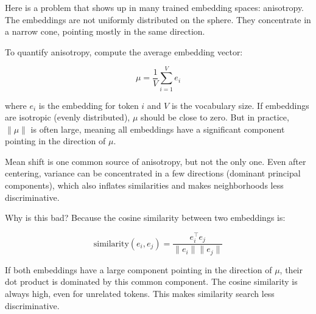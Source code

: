 Here is a problem that shows up in many trained embedding spaces: anisotropy. The embeddings are not uniformly distributed on the sphere. They concentrate in a narrow cone, pointing mostly in the same direction.

To quantify anisotropy, compute the average embedding vector:

\begin{equation}
\mu = \frac{1}{V} \sum_{i=1}^V e_i
\end{equation}

where $e_i$ is the embedding for token $i$ and $V$ is the vocabulary size. If embeddings are isotropic (evenly distributed), $\mu$ should be close to zero. But in practice, $\|\mu\|$ is often large, meaning all embeddings have a significant component pointing in the direction of $\mu$.

Mean shift is one common source of anisotropy, but not the only one. Even after centering, variance can be concentrated in a few directions (dominant principal components), which also inflates similarities and makes neighborhoods less discriminative.

\vspace{1em}

Why is this bad? Because the cosine similarity between two embeddings is:

\begin{equation}
\text{similarity}(e_i, e_j) = \frac{e_i^\top e_j}{\|e_i\| \|e_j\|}
\end{equation}

If both embeddings have a large component pointing in the direction of $\mu$, their dot product is dominated by this common component. The cosine similarity is always high, even for unrelated tokens. This makes similarity search less discriminative.

\vspace{1.5em}

